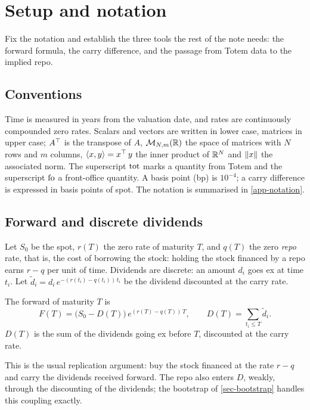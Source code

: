 \section{Setup and notation}\label{sec-setup}

\begin{objectif}
Fix the notation and establish the three tools the rest of the note needs: the forward formula, the carry
difference, and the passage from Totem data to the implied repo.
\end{objectif}

\subsection{Conventions}
Time is measured in years from the valuation date, and rates are continuously compounded zero rates. Scalars and
vectors are written in lower case, matrices in upper case; ${A}^{\top}$ is the transpose of $A$, $\mathcal{M}_{N,m}(\mathbb{R})$ the space
of matrices with $N$ rows and $m$ columns, $\langle x, y\rangle={x}^{\top}\,y$ the inner product of $\mathbb{R}^N$ and $\lVert x\rVert$ the
associated norm. The superscript $\mathrm{tot}$ marks a quantity from Totem and the superscript $\mathrm{fo}$ a front-office quantity.
A basis point (bp) is $10^{-4}$; a carry difference is expressed in basis points of spot. The notation is summarised
in \cref{app-notation}.

\subsection{Forward and discrete dividends}
Let $S_0$ be the spot, $r(T)$ the zero rate of maturity $T$, and $q(T)$ the zero \emph{repo} rate, that is, the cost
of borrowing the stock: holding the stock financed by a repo earns $r-q$ per unit of time. Dividends are discrete: an
amount $d_i$ goes ex at time $t_i$. Let $\tilde d_i=d_i\,e^{-(r(t_i)-q(t_i))\,t_i}$ be the dividend discounted at the
carry rate.

\begin{definition}[Forward]\label{def-forward}
The forward of maturity $T$ is
\begin{equation}\label{eq-forward}
F(T)=\bigl(S_0-D(T)\bigr)\,e^{(r(T)-q(T))\,T}, \qquad D(T)=\sum_{t_i\le T}\tilde d_i .
\end{equation}
$D(T)$ is the sum of the dividends going ex before $T$, discounted at the carry rate.
\end{definition}

This is the usual replication argument: buy the stock financed at the rate $r-q$ and carry the dividends received
forward. The repo also enters $D$, weakly, through the discounting of the dividends; the bootstrap of
\cref{sec-bootstrap} handles this coupling exactly.

